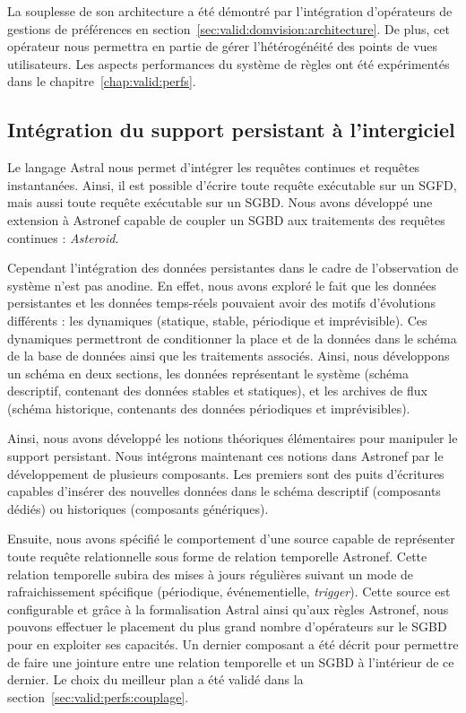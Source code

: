 La souplesse de son architecture a été démontré par l'intégration d'opérateurs de gestions de préférences en section~\ref{sec:valid:domvision:architecture}. De plus, cet opérateur nous permettra en partie de gérer l'hétérogénéité des points de vues utilisateurs. Les aspects performances du système de règles ont été expérimentés dans le chapitre~\ref{chap:valid:perfs}.

\subsection{Intégration du support persistant à l'intergiciel}
Le langage Astral nous permet d'intégrer les requêtes continues et requêtes instantanées. Ainsi, il est possible d'écrire toute requête exécutable sur un SGFD, mais aussi toute requête exécutable sur un SGBD. Nous avons développé une extension à Astronef capable de coupler un SGBD aux traitements des requêtes continues : \textit{Asteroid}.

Cependant l'intégration des données persistantes dans le cadre de l'observation de système n'est pas anodine. En effet, nous avons exploré le fait que les données persistantes et les données temps-réels pouvaient avoir des motifs d'évolutions différents : les dynamiques (statique, stable, périodique et imprévisible). Ces dynamiques permettront de conditionner la place et de la données dans le schéma de la base de données ainsi que les traitements associés. Ainsi, nous développons un schéma en deux sections, les données représentant le système (schéma descriptif, contenant des données stables et statiques), et les archives de flux (schéma historique, contenants des données périodiques et imprévisibles).

Ainsi, nous avons développé les notions théoriques élémentaires pour manipuler le support persistant. Nous intégrons maintenant ces notions dans Astronef par le développement de plusieurs composants. Les premiers sont des puits d'écritures capables d'insérer des nouvelles données dans le schéma descriptif (composants dédiés) ou historiques (composants génériques).

Ensuite, nous avons spécifié le comportement d'une source capable de représenter toute requête relationnelle sous forme de relation temporelle Astronef. Cette relation temporelle subira des mises à jours régulières suivant un mode de rafraichissement spécifique (périodique, événementielle, \textit{trigger}). Cette source est configurable et grâce à la formalisation Astral ainsi qu'aux règles Astronef, nous pouvons effectuer le placement du plus grand nombre d'opérateurs sur le SGBD pour en exploiter ses capacités. Un dernier composant a été décrit pour permettre de faire une jointure entre une relation temporelle et un SGBD à l'intérieur de ce dernier. Le choix du meilleur plan a été validé dans la section~\ref{sec:valid:perfs:couplage}.

